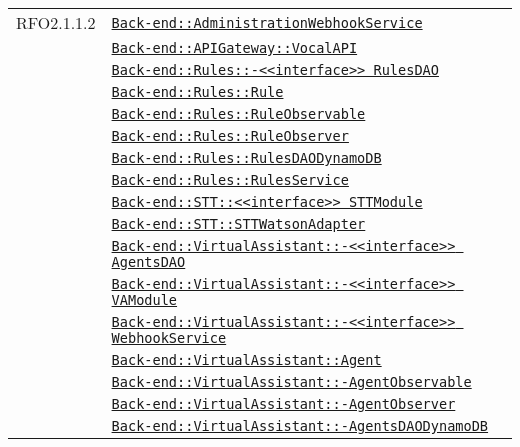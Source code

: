 \begin{longtable}{|>{\centering}m{3cm}|m{10cm}<{\centering}|}
RFO2.1.1.2 & \hyperref[Back-end::AdministrationWebhookService]{\texttt{Back-end::AdministrationWebhookService}}\\
& \hyperref[Back-end::APIGateway::VocalAPI]{\texttt{Back-end::APIGateway::VocalAPI}}\\
& \hyperref[Back-end::Rules::<<interface>> RulesDAO]{\texttt{Back-end::Rules::-\linebreak <<interface>> RulesDAO}}\\
& \hyperref[Back-end::Rules::Rule]{\texttt{Back-end::Rules::Rule}}\\
& \hyperref[Back-end::Rules::RuleObservable]{\texttt{Back-end::Rules::RuleObservable}}\\
& \hyperref[Back-end::Rules::RuleObserver]{\texttt{Back-end::Rules::RuleObserver}}\\
& \hyperref[Back-end::Rules::RulesDAODynamoDB]{\texttt{Back-end::Rules::RulesDAODynamoDB}}\\
& \hyperref[Back-end::Rules::RulesService]{\texttt{Back-end::Rules::RulesService}}\\
& \hyperref[Back-end::STT::<<interface>> STTModule]{\texttt{Back-end::STT::<<interface>> STTModule}}\\
& \hyperref[Back-end::STT::STTWatsonAdapter]{\texttt{Back-end::STT::STTWatsonAdapter}}\\
& \hyperref[Back-end::VirtualAssistant::<<interface>> AgentsDAO]{\texttt{Back-end::VirtualAssistant::-\linebreak <<interface>> AgentsDAO}}\\
& \hyperref[Back-end::VirtualAssistant::<<interface>> VAModule]{\texttt{Back-end::VirtualAssistant::-\linebreak <<interface>> VAModule}}\\
& \hyperref[Back-end::VirtualAssistant::<<interface>> WebhookService]{\texttt{Back-end::VirtualAssistant::-\linebreak <<interface>> WebhookService}}\\
& \hyperref[Back-end::VirtualAssistant::Agent]{\texttt{Back-end::VirtualAssistant::Agent}}\\
& \hyperref[Back-end::VirtualAssistant::AgentObservable]{\texttt{Back-end::VirtualAssistant::-\linebreak AgentObservable}}\\
& \hyperref[Back-end::VirtualAssistant::AgentObserver]{\texttt{Back-end::VirtualAssistant::-\linebreak AgentObserver}}\\
& \hyperref[Back-end::VirtualAssistant::AgentsDAODynamoDB]{\texttt{Back-end::VirtualAssistant::-\linebreak AgentsDAODynamoDB}}\\

\end{longtable}
